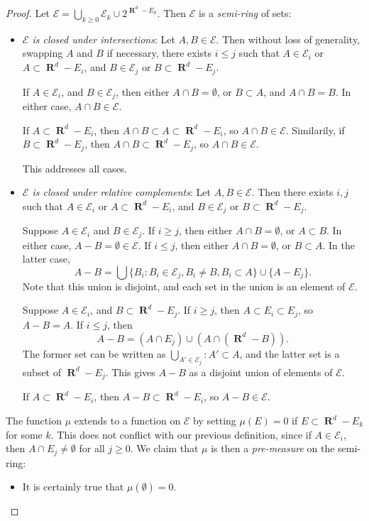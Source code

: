 \documentclass{article}
\DeclareMathOperator{\RR}{\mathbf{R}}
\theoremstyle{plain}
\begin{document}
\begin{proof}
    Let $\mathcal{E} = \bigcup_{k \geq 0} \mathcal{E}_k \cup 2^{\RR^d - E_k}$. Then $\mathcal{E}$ is a \emph{semi-ring} of sets:
    \begin{itemize}
        \item \emph{$\mathcal{E}$ is closed under intersections}: Let $A, B \in \mathcal{E}$. Then without loss of generality, swapping $A$ and $B$ if necessary, there exists $i \leq j$ such that $A \in \mathcal{E}_i$ or $A \subset \RR^d - E_i$, and $B \in \mathcal{E}_j$ or $B \subset \RR^d - E_j$.

        If $A \in \mathcal{E}_i$, and $B \in \mathcal{E}_j$, then either $A \cap B = \emptyset$, or $B \subset A$, and $A \cap B = B$. In either case, $A \cap B \in \mathcal{E}$.

        If $A \subset \RR^d - E_i$, then $A \cap B \subset A \subset \RR^d - E_i$, so $A \cap B \in \mathcal{E}$. Similarily, if $B \subset \RR^d - E_j$, then $A \cap B \subset \RR^d - E_j$, so $A \cap B \in \mathcal{E}$.

        This addresses all cases.

        \item \emph{$\mathcal{E}$ is closed under relative complements}: Let $A,B \in \mathcal{E}$. Then there exists $i,j$ such that $A \in \mathcal{E}_i$ or $A \subset \RR^d - E_i$, and $B \in \mathcal{E}_j$ or $B \subset \RR^d - E_j$.

        Suppose $A \in \mathcal{E}_i$ and $B \in \mathcal{E}_j$. If $i \geq j$, then either $A \cap B = \emptyset$, or $A \subset B$. In either case, $A - B = \emptyset \in \mathcal{E}$. If $i \leq j$, then either $A \cap B = \emptyset$, or $B \subset A$. In the latter case,
        \[ A - B = \bigcup \{ B_i : B_i \in \mathcal{E}_j, B_i \neq B, B_i \subset A \} \cup \{ A - E_j \}. \]
        Note that this union is disjoint, and each set in the union is an element of $\mathcal{E}$.

        Suppose $A \in \mathcal{E}_i$, and $B \subset \RR^d - E_j$. If $i \geq j$, then $A \subset E_i \subset E_j$, so $A - B = A$. If $i \leq j$, then
        \[ A - B = (A \cap E_j) \cup (A \cap (\RR^d - B)). \]
        The former set can be written as $\bigcup_{A' \in \mathcal{E}_j} : A' \subset A$, and the latter set is a subset of $\RR^d - E_j$. This gives $A - B$ as a disjoint union of elements of $\mathcal{E}$.

        If $A \subset \RR^d - E_i$, then $A - B \subset \RR^d - E_i$, so $A - B \in \mathcal{E}$.
    \end{itemize}
    The function $\mu$ extends to a function on $\mathcal{E}$ by setting $\mu(E) = 0$ if $E \subset \RR^d - E_k$ for some $k$. This does not conflict with our previous definition, since if $A \in \mathcal{E}_i$, then $A \cap E_j \neq \emptyset$ for all $j \geq 0$. We claim that $\mu$ is then a \emph{pre-measure} on the semi-ring:
    \begin{itemize}
        \item It is certainly true that $\mu(\emptyset) = 0$.


\end{itemize}
\end{proof}
\end{document}
